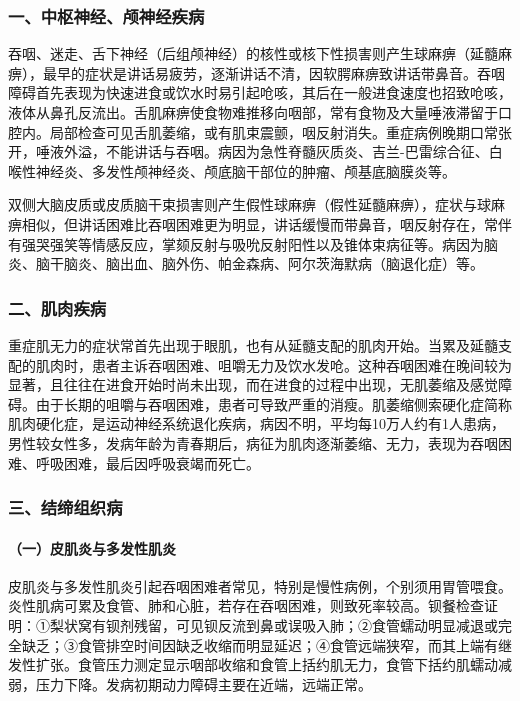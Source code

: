 \subsubsection{一、中枢神经、颅神经疾病}

吞咽、迷走、舌下神经（后组颅神经）的核性或核下性损害则产生球麻痹（延髓麻痹），最早的症状是讲话易疲劳，逐渐讲话不清，因软腭麻痹致讲话带鼻音。吞咽障碍首先表现为快速进食或饮水时易引起呛咳，其后在一般进食速度也招致呛咳，液体从鼻孔反流出。舌肌麻痹使食物难推移向咽部，常有食物及大量唾液滞留于口腔内。局部检查可见舌肌萎缩，或有肌束震颤，咽反射消失。重症病例晚期口常张开，唾液外溢，不能讲话与吞咽。病因为急性脊髓灰质炎、吉兰-巴雷综合征、白喉性神经炎、多发性颅神经炎、颅底脑干部位的肿瘤、颅基底脑膜炎等。

双侧大脑皮质或皮质脑干束损害则产生假性球麻痹（假性延髓麻痹），症状与球麻痹相似，但讲话困难比吞咽困难更为明显，讲话缓慢而带鼻音，咽反射存在，常伴有强哭强笑等情感反应，掌颏反射与吸吮反射阳性以及锥体束病征等。病因为脑炎、脑干脑炎、脑出血、脑外伤、帕金森病、阿尔茨海默病（脑退化症）等。

\subsubsection{二、肌肉疾病}

重症肌无力的症状常首先出现于眼肌，也有从延髓支配的肌肉开始。当累及延髓支配的肌肉时，患者主诉吞咽困难、咀嚼无力及饮水发呛。这种吞咽困难在晚间较为显著，且往往在进食开始时尚未出现，而在进食的过程中出现，无肌萎缩及感觉障碍。由于长期的咀嚼与吞咽困难，患者可导致严重的消瘦。肌萎缩侧索硬化症简称肌肉硬化症，是运动神经系统退化疾病，病因不明，平均每10万人约有1人患病，男性较女性多，发病年龄为青春期后，病征为肌肉逐渐萎缩、无力，表现为吞咽困难、呼吸困难，最后因呼吸衰竭而死亡。

\subsubsection{三、结缔组织病}

\paragraph{（一）皮肌炎与多发性肌炎}

皮肌炎与多发性肌炎引起吞咽困难者常见，特别是慢性病例，个别须用胃管喂食。炎性肌病可累及食管、肺和心脏，若存在吞咽困难，则致死率较高。钡餐检查证明：①梨状窝有钡剂残留，可见钡反流到鼻或误吸入肺；②食管蠕动明显减退或完全缺乏；③食管排空时间因缺乏收缩而明显延迟；④食管远端狭窄，而其上端有继发性扩张。食管压力测定显示咽部收缩和食管上括约肌无力，食管下括约肌蠕动减弱，压力下降。发病初期动力障碍主要在近端，远端正常。

